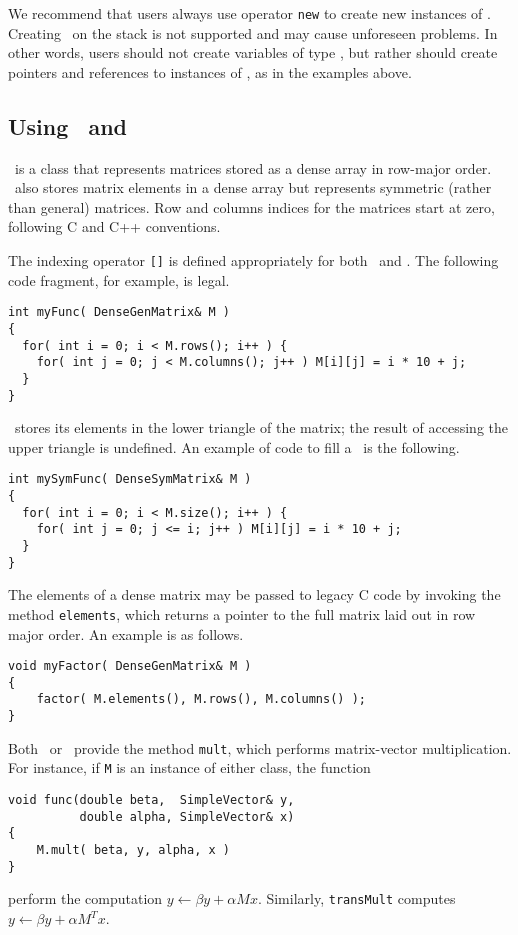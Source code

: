 We recommend that users always use operator \texttt{new} to create new
instances of \SimpleVector. Creating \SimpleVector\ on the stack is
not supported and may cause unforeseen problems. In other words, users
should not create variables of type \SimpleVector, but rather should
create pointers and references to instances of \SimpleVector, as in
the examples above.

\subsection{Using \DenseGenMatrix\ and \DenseSymMatrix}
\label{sec.dense.matrix}

\DenseGenMatrix\ is a class that represents matrices stored as a dense
array in row-major order. \DenseSymMatrix\ also stores matrix elements
in a dense array but represents symmetric (rather than general)
matrices. Row and columns indices for the matrices start at zero,
following C and C++ conventions.

The indexing operator \verb-[]- is defined appropriately for both
\DenseGenMatrix\ and \DenseSymMatrix. The following code fragment, for
example, is legal.
\begin{verbatim}
int myFunc( DenseGenMatrix& M )
{
  for( int i = 0; i < M.rows(); i++ ) {
    for( int j = 0; j < M.columns(); j++ ) M[i][j] = i * 10 + j;
  }
}
\end{verbatim}

\DenseSymMatrix\ stores its elements in the lower triangle of the
matrix; the result of accessing the upper triangle is undefined.  An
example of code to fill a \DenseSymMatrix\ is the following.
\begin{verbatim}
int mySymFunc( DenseSymMatrix& M )
{
  for( int i = 0; i < M.size(); i++ ) {
    for( int j = 0; j <= i; j++ ) M[i][j] = i * 10 + j;
  }
}
\end{verbatim}

The elements of a dense matrix may be passed to legacy C code by
invoking the method {\tt elements}, which returns a pointer to the
full matrix laid out in row major order. An example is as follows.
\begin{verbatim}
void myFactor( DenseGenMatrix& M )
{
    factor( M.elements(), M.rows(), M.columns() );
}
\end{verbatim}


Both \DenseGenMatrix\ or \DenseSymMatrix\ provide the method
\texttt{mult}, which performs matrix-vector multiplication. For
instance, if \texttt{M} is an instance of either class, the function
\begin{verbatim}
void func(double beta,  SimpleVector& y, 
          double alpha, SimpleVector& x)
{
    M.mult( beta, y, alpha, x )
}
\end{verbatim}
perform the computation $y \gets \beta y + \alpha M x$.  Similarly,
\texttt{transMult} computes $y \gets \beta y + \alpha M^{T} x$.

